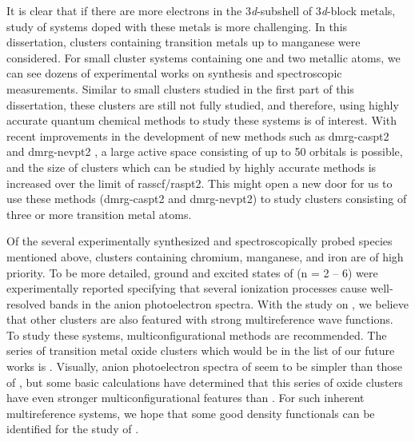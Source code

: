 \begin{refsection}
It is clear that if there are more electrons in the 3\textit{d}-subshell of 3\textit{d}-block metals, study of systems doped with these metals is more challenging. In this dissertation, clusters containing transition metals up to manganese were considered. For small cluster systems containing one and two metallic atoms, we can see dozens of experimental works on synthesis and spectroscopic measurements. \cite{con:2, con:3, con:5, con:6, con:7, con:8, con:9, con:10, con:11, con:12} Similar to small clusters studied in the first part of this dissertation, these clusters are still not fully studied, and therefore, using highly accurate quantum chemical methods to study these systems is of interest. With recent improvements in the development of new methods such as \acrshort{dmrg}-\acrshort{caspt2} \cite{con:dmrgcaspt2} and \acrshort{dmrg}-\acrshort{nevpt2} \cite{con:dmrgnevpt2:1, con:dmrgnevpt2:2}, a large active space consisting of up to 50 orbitals is possible, and the size of clusters which can be studied by highly accurate methods is increased over the limit of \acrshort{rasscf}/\acrshort{raspt2}. This might open a new door for us to use these methods (\acrshort{dmrg}-\acrshort{caspt2} and \acrshort{dmrg}-\acrshort{nevpt2}) to study clusters consisting of three or more transition metal atoms. 


Of the several experimentally synthesized and spectroscopically probed species mentioned above, clusters containing chromium, manganese, and iron are of high priority. To be more detailed, ground and excited states of  (n = 2 -- 6) were experimentally reported \cite{con:9} specifying that several ionization processes cause well-resolved bands in the anion photoelectron spectra. With the study on , \cite{con:cr2o2} we believe that other  clusters are also featured with strong multireference wave functions. To study these systems, multiconfigurational methods are recommended. The series of transition metal oxide clusters which would be in the list of our future works is . Visually, anion photoelectron spectra of  seem to be simpler than those of , \cite{con:8, con:9} but some basic calculations have determined that this series of oxide clusters have even stronger multiconfigurational features than . For such inherent multireference systems, we hope that some good density functionals can be identified for the study of . 




\end{refsection}
